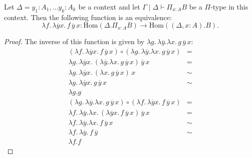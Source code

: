 \documentclass[reqno]{amsart}
\theoremstyle{definition}
\theoremstyle{remark}
\newcommand{\ob}{}
\newcommand{\fs}[1]{\mathrm{#1}}
\newcommand{\Hom}{\fs{Hom}}
\numberwithin{figure}{section}
\begin{document}
\begin{lem}
Let $\Delta = y_1 : A_1, \ldots y_k : A_k$ be a context and let $\Gamma \mid \Delta \vdash \Pi_{x : A} B \ob$ be a $\Pi$-type in this context.
Then the following function is an equivalence:
\[ \lambda f.\,\lambda \overline{y} x.\,f\,\overline{y}\,x : \Hom(\Delta. \Pi_{x : A} B) \to \Hom((\Delta, x : A). B). \]
\end{lem}
\begin{proof}
The inverse of this function is given by $\lambda g.\,\lambda \overline{y}.\lambda x.\,g\,\overline{y}\,x$:
\begin{align*}
(\lambda f.\,\lambda \overline{y} x.\,f\,\overline{y}\,x) \circ (\lambda g.\,\lambda \overline{y}.\lambda x.\,g\,\overline{y}\,x) & = \\
\lambda g.\,\lambda \overline{y} x.\,(\lambda \overline{y}.\lambda x.\,g\,\overline{y}\,x)\,\overline{y}\,x & = \\
\lambda g.\,\lambda \overline{y} x.\,(\lambda x.\,g\,\overline{y}\,x)\,x & \sim \\
\lambda g.\,\lambda \overline{y} x.\,g\,\overline{y}\,x & \sim \\
\lambda g.g &
\end{align*}
\begin{align*}
(\lambda g.\,\lambda \overline{y}.\lambda x.\,g\,\overline{y}\,x) \circ (\lambda f.\,\lambda \overline{y} x.\,f\,\overline{y}\,x) & = \\
\lambda f.\,\lambda \overline{y}.\lambda x.\,(\lambda \overline{y} x.\,f\,\overline{y}\,x)\,\overline{y}\,x & = \\
\lambda f.\,\lambda \overline{y}.\lambda x.\,f\,\overline{y}\,x & \sim \\
\lambda f.\,\lambda \overline{y}.\,f\,\overline{y} & \sim \\
\lambda f.f &
\end{align*}
\end{proof}
\end{document}
